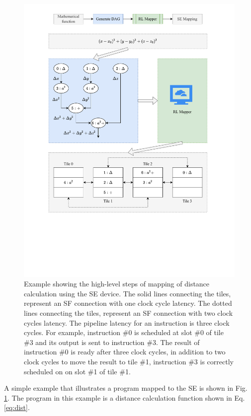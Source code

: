 \begin{figure}
  \centering
  \includegraphics[trim=70 180 70 25, clip, width=\linewidth]{fig/SE_example.pdf}
  \caption{
    Example showing the high-level steps of mapping of distance calculation using the SE device.
    The solid lines connecting the tiles, represent an SF connection with one clock cycle latency.
    The dotted lines connecting the tiles, represent an SF connection with two clock cycles latency.
    The pipeline latency for an instruction is three clock cycles.
    For example, instruction \#0 is scheduled at slot \#0 of tile \#3 and its output is sent to instruction \#3.
    The result of instruction \#0 is ready after three clock cycles, in addition to two clock cycles to move the result to tile \#1, instruction \#3 is correctly scheduled on on slot \#1 of tile \#1.
  }
  \label{fig:se_example}
\end{figure}

A simple example that illustrates a program mapped to the SE is shown in Fig. \ref{fig:se_example}.
The program in this example is a distance calculation function shown in Eq. \ref{eq:dist}.


